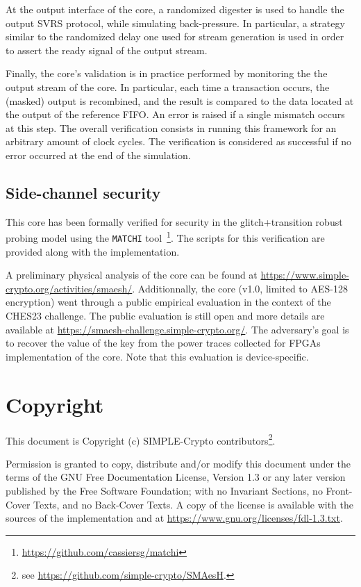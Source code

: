 \documentclass{scrartcl}
\begin{document}
At the output interface of the core, a randomized digester is used to handle the
output SVRS protocol, while simulating back-pressure. In particular, a strategy
similar to the randomized delay one used for stream generation is used in order
to assert the ready signal of the output stream. 

Finally, the core's validation is in practice performed by monitoring the
the output stream of the core. In particular, each time a transaction occurs,
the (masked) output is recombined, and the result is compared to the data
located at the output of the reference FIFO. An error is raised if a single
mismatch occurs at this step. The overall verification consists in running this
framework for an arbitrary amount of clock cycles.  The verification is
considered as successful if no error occurred at the end of the simulation. 

\subsection{Side-channel security}
This core has been formally verified for security in the glitch+transition
robust probing model using the \texttt{MATCHI}%
tool~\cite{DBLP:journals/tc/CassiersGLS21,DBLP:journals/tches/CassiersS21}\footnote{\url{https://github.com/cassiersg/matchi}}.
The scripts for this verification are provided along with the implementation.

A preliminary physical analysis of the core can be found at
\url{https://www.simple-crypto.org/activities/smaesh/}.  Additionnally, the
core (v1.0, limited to AES-128 encryption) went through a public empirical
evaluation in the context of the CHES23 challenge. The public evaluation
is still open and more details are available at
\url{https://smaesh-challenge.simple-crypto.org/}.  The adversary's goal is to
recover the value of the key from the power traces collected for FPGAs
implementation of the core. Note that this evaluation is device-specific.

\section{Copyright}

This document is Copyright (c) SIMPLE-Crypto contributors\footnote{see \url{https://github.com/simple-crypto/SMAesH}.}.

Permission is granted to copy, distribute and/or modify this document under the
terms of the GNU Free Documentation License, Version 1.3 or any later version
published by the Free Software Foundation; with no Invariant Sections, no
Front-Cover Texts, and no Back-Cover Texts.
A copy of the license is available with the sources of the implementation and
at \url{https://www.gnu.org/licenses/fdl-1.3.txt}.



\end{document}

